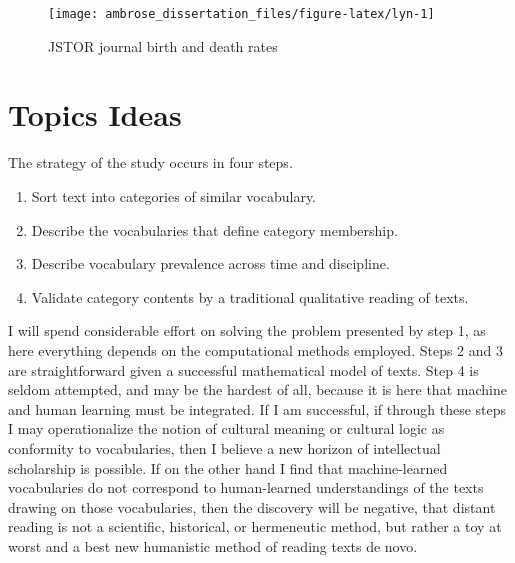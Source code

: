 \documentclass[]{book}
\providecommand{\tightlist}{%
  \setlength{\itemsep}{0pt}\setlength{\parskip}{0pt}}
\theoremstyle{definition}
\theoremstyle{definition}
\theoremstyle{definition}
\theoremstyle{remark}
\begin{document}
\begin{figure}

{\centering \texttt{[image: ambrose\_dissertation\_files/figure-latex/lyn-1]} 

}

\caption{JSTOR journal birth and death rates}\label{fig:lyn}
\end{figure}

\hypertarget{topics-ideas}{%
\section{\texorpdfstring{Topics 
Ideas}{Topics  Ideas}}\label{topics-ideas}}

The strategy of the study occurs in four steps.

\begin{enumerate}
\def\labelenumi{\arabic{enumi}.}
\tightlist
\item
  Sort text into categories of similar vocabulary.
\item
  Describe the vocabularies that define category membership.
\item
  Describe vocabulary prevalence across time and discipline.
\item
  Validate category contents by a traditional qualitative reading of
  texts.
\end{enumerate}

I will spend considerable effort on solving the problem presented by
step 1, as here everything depends on the computational methods
employed. Steps 2 and 3 are straightforward given a successful
mathematical model of texts. Step 4 is seldom attempted, and may be the
hardest of all, because it is here that machine and human learning must
be integrated. If I am successful, if through these steps I may
operationalize the notion of cultural meaning or cultural logic as
conformity to vocabularies, then I believe a new horizon of intellectual
scholarship is possible. If on the other hand I find that
machine-learned vocabularies do not correspond to human-learned
understandings of the texts drawing on those vocabularies, then the
discovery will be negative, that distant reading is not a scientific,
historical, or hermeneutic method, but rather a toy at worst and a best
new humanistic method of reading texts de novo.
\end{document}
